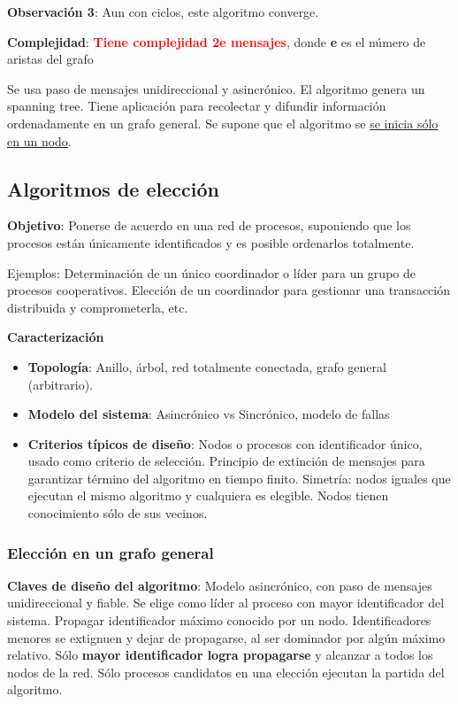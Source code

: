 \textbf{Observación 3}: Aun con ciclos, este algoritmo converge.

\textbf{Complejidad}: \textcolor{red}{\textbf{Tiene complejidad 2e mensajes}}, donde \textbf{e} es el número de aristas del grafo

Se usa paso de mensajes unidireccional y asincrónico. El algoritmo genera un spanning tree. Tiene aplicación para recolectar y difundir información ordenadamente en un grafo general. Se supone que el algoritmo se \underline{se inicia sólo en un nodo}.

\subsection{Algoritmos de elección}
\textbf{Objetivo}: Ponerse de acuerdo en una red de procesos, suponiendo que los procesos están únicamente identificados y es posible ordenarlos totalmente.

Ejemplos: Determinación de un único coordinador o líder para un grupo de procesos cooperativos. Elección de un coordinador para gestionar una transacción distribuida y comprometerla, etc.

\vspace{0.5em}

\textbf{Caracterización} \begin{itemize}
    \item \textbf{Topología}: Anillo, árbol, red totalmente conectada, grafo general (arbitrario).
    \item \textbf{Modelo del sistema}: Asincrónico vs Sincrónico, modelo de fallas
    \item \textbf{Criterios típicos de diseño}: Nodos o procesos con identificador único, usado como criterio de selección. Principio de extinción de mensajes para garantizar término del algoritmo en tiempo finito. Simetría: nodos iguales que ejecutan el mismo algoritmo y cualquiera es elegible. Nodos tienen conocimiento sólo de sus vecinos.
\end{itemize}

\subsubsection{Elección en un grafo general}

\textbf{Claves de diseño del algoritmo}: Modelo asincrónico, con paso de mensajes unidireccional y fiable. Se elige como líder al proceso con mayor identificador del sistema. Propagar identificador máximo conocido por un nodo. Identificadores menores se extignuen y dejar de propagarse, al ser dominador por algún máximo relativo. Sólo \textbf{mayor identificador logra propagarse} y alcanzar a todos los nodos de la red. Sólo procesos candidatos en una elección ejecutan la partida del algoritmo.

